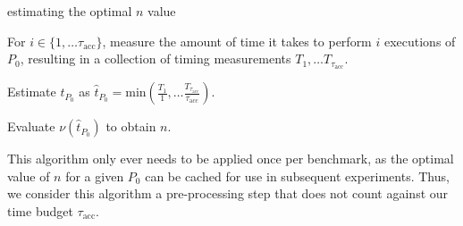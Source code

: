 \documentclass[conference]{IEEEtran}
\begin{document}
\begin{algorithm}
    \caption{estimating the optimal $n$ value}
    For $i \in \{1, \dots \tau_{\textrm{acc}}\}$, measure the amount of time it takes
    to perform $i$ executions of $P_0$, resulting in a collection of timing measurements
    $T_1, \dots T_{\tau_{\textrm{acc}}}$.

    Estimate $t_{P_0}$ as $\hat{t}_{P_0} = \textrm{min}(\frac{T_1}{1}, \dots \frac{T_{\tau_{\textrm{acc}}}}{\tau_{\textrm{acc}}})$.

    Evaluate $\nu(\hat{t}_{P_0})$ to obtain $n$.
\end{algorithm}

This algorithm only ever needs to be applied once per benchmark, as the optimal value of $n$
for a given $P_0$ can be cached for use in subsequent experiments. Thus, we consider this
algorithm a pre-processing step that does not count against our time budget
$\tau_{\textrm{acc}}$.


%
%
\end{document}

